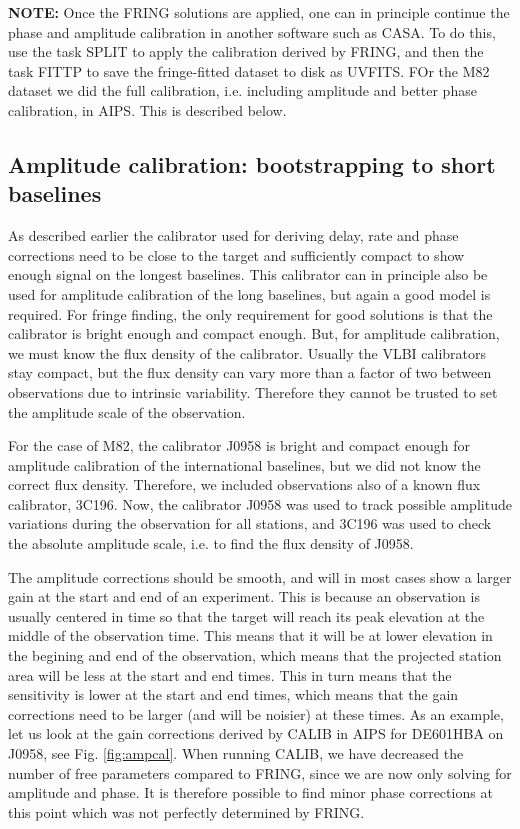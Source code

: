 {\bf NOTE:} Once the FRING solutions are applied, one can in principle 
continue the phase and amplitude calibration in another software such as CASA.
To do this, use the task SPLIT to apply the calibration derived by FRING, and then
the task FITTP to save the fringe-fitted dataset to disk as UVFITS.
FOr the M82 dataset we did the full calibration, i.e. including amplitude
and better phase calibration, in AIPS. This is described below.

\subsection{Amplitude calibration: bootstrapping to short baselines}
As described earlier the calibrator used for deriving delay, rate and phase
corrections need to be close to the target and sufficiently compact to show
enough signal on the longest baselines. This calibrator can in principle also
be used for amplitude calibration of the long baselines, but again a good model
is required. For fringe finding, the only requirement for good solutions is
that the calibrator is bright enough and compact enough.  But, for amplitude
calibration, we must know the flux density of the calibrator.  Usually the VLBI
calibrators stay compact, but the flux density can vary more than a factor of
two between observations due to intrinsic variability. Therefore they cannot be
trusted to set the amplitude scale of the observation. 

For the case of M82, the calibrator J0958 is bright and compact enough for
amplitude calibration of the international baselines, but we did not know the
correct flux density.  Therefore, we included observations also of a known flux
calibrator, 3C196. Now, the calibrator J0958 was used to track possible
amplitude variations during the observation for all stations, and 3C196 was
used to check the absolute amplitude scale, i.e. to find the flux density of
J0958. 

The amplitude corrections should be smooth, and will in most cases show a
larger gain at the start and end of an experiment.  This is because an
observation is usually centered in time so that the target will reach its peak
elevation at the middle of the observation time. This means that it will be at
lower elevation in the begining and end of the observation, which means that
the projected station area will be less at the start and end times. This in
turn means that the sensitivity is lower at the start and end times, which
means that the gain corrections need to be larger (and will be noisier) at
these times. As an example, let us look at the gain corrections derived by
CALIB in AIPS for DE601HBA on J0958, see Fig. \ref{fig:ampcal}.  When running
CALIB, we have decreased the number of free parameters compared to FRING, since
we are now only solving for amplitude and phase.  It is therefore possible to
find minor phase corrections at this point which was not perfectly determined
by FRING.

